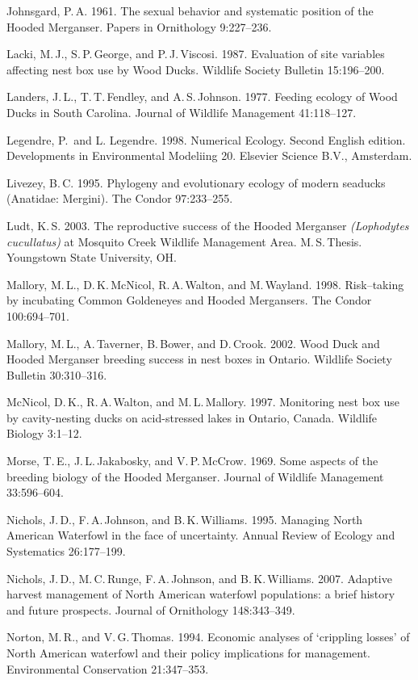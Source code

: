 \begin{hangparas}{2em}{1}
	Johnsgard, P.\,A. 1961. The sexual behavior and systematic position of the Hooded Merganser. Papers in Ornithology 9:227–236.
	
	Lacki, M.\,J., S.\,P.\,George, and P.\,J.\,Viscosi. 1987. Evaluation of site variables affecting nest box use by Wood Ducks. Wildlife Society Bulletin 15:196–200. 
	
	Landers, J.\,L., T.\,T.\,Fendley, and A.\,S.\,Johnson. 1977. Feeding ecology of Wood Ducks in South Carolina. Journal of Wildlife Management 41:118–127. 
	
	Legendre, P.\, and L. Legendre. 1998. Numerical Ecology. Second English edition. Developments in Environmental Modeliing 20. Elsevier Science B.V., Amsterdam.
	
	Livezey, B.\,C. 1995. Phylogeny and evolutionary ecology of modern seaducks (Anatidae: Mergini). The Condor 97:233–255. 
	
	Ludt, K.\,S. 2003. The reproductive success of the Hooded Merganser \textit{(Lophodytes cucullatus)} at Mosquito Creek Wildlife Management Area. M.\,S.\,Thesis. Youngstown State University, OH.
	
	Mallory, M.\,L., D.\,K.\,McNicol, R.\,A.\,Walton, and M.\,Wayland. 1998. Risk–taking by incubating Common Goldeneyes and Hooded Mergansers. The Condor 100:694–701. 
	
	Mallory, M.\,L., A.\,Taverner, B.\,Bower, and D.\,Crook. 2002. Wood Duck and Hooded Merganser breeding success in nest boxes in Ontario. Wildlife Society Bulletin 30:310–316. 
	
	McNicol, D.\,K., R.\,A.\,Walton, and M.\,L.\,Mallory. 1997. Monitoring nest box use by cavity-nesting ducks on acid-stressed lakes in Ontario, Canada. Wildlife Biology 3:1–12. 
	
	Morse, T.\,E., J.\,L.\,Jakabosky, and V.\,P.\,McCrow. 1969. Some aspects of the breeding biology of the Hooded Merganser. Journal of Wildlife Management 33:596–604. 
	
	Nichols, J.\,D., F.\,A.\,Johnson, and B.\,K.\,Williams. 1995. Managing North American Waterfowl in the face of uncertainty. Annual Review of Ecology and Systematics 26:177–199. 
	
	Nichols, J.\,D., M.\,C.\,Runge, F.\,A.\,Johnson, and B.\,K.\,Williams. 2007. Adaptive harvest management of North American waterfowl populations: a brief history and future prospects. Journal of Ornithology 148:343–349. 
	
	Norton, M.\,R., and V.\,G.\,Thomas. 1994. Economic analyses of ‘crippling losses’ of North American waterfowl and their policy implications for management. Environmental Conservation 21:347–353. 
	

\end{hangparas}
